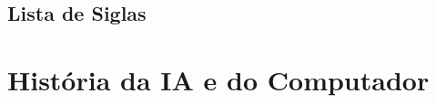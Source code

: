 \documentclass[
    12pt,            %
    a4paper,         %
    book,            %
    openright,       %
    twoside,         %
    brazil,          %
    citacao=authoryear
]{abntex2}
\begin{document}


\frontmatter

\imprimircapa
\imprimirfolhaderosto


\tableofcontents

\cleardoublepage
{}
\chapter*{Lista de Siglas}

\mainmatter

\part{História da IA e do Computador}



\end{document}
